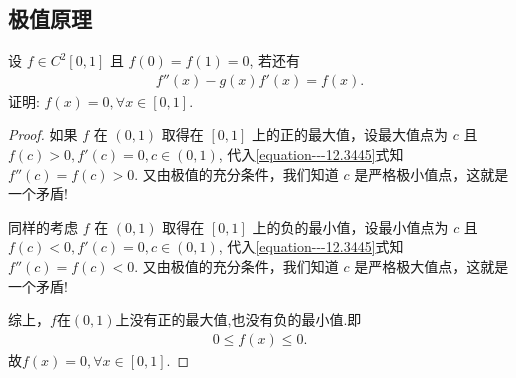 \documentclass[../../main.tex]{subfiles}%
\begin{document}
\subsection{极值原理}

\begin{example}
设 $f\in C^2[0,1]$ 且 $f(0)=f(1)=0$, 若还有
\begin{align}
f''(x)-g(x)f'(x)=f(x).
\label{equation---12.3445}
\end{align}
证明:
$f(x)=0,\forall x\in[0,1]$.
\end{example}
\begin{proof}

如果 $f$ 在 $(0,1)$ 取得在 $[0,1]$ 上的正的最大值，设最大值点为 $c$ 且 $f(c)>0,f'(c)=0,c\in(0,1)$, 代入\eqref{equation---12.3445}式知 $f''(c)=f(c)>0$. 又由极值的充分条件，我们知道 $c$ 是严格极小值点，这就是一个矛盾!

同样的考虑 $f$ 在 $(0,1)$ 取得在 $[0,1]$ 上的负的最小值，设最小值点为 $c$ 且 $f(c)<0,f'(c)=0,c\in(0,1)$, 代入\eqref{equation---12.3445}式知 $f''(c)=f(c)<0$. 又由极值的充分条件，我们知道 $c$ 是严格极大值点，这就是一个矛盾!

综上，$f$在$(0,1)$上没有正的最大值,也没有负的最小值.即
\begin{align*}
0\leqslant f(x)\leqslant0.
\end{align*}
故$f(x)=0,\forall x\in[0,1]$. 

\end{proof}
\end{document}
